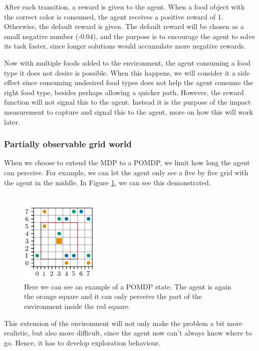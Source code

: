 \documentclass[12pt,A4]{report}
\theoremstyle{definition}
\begin{document}
After each transition, a reward is given to the agent. When a food object with the correct color is consumed, the agent receives a positive reward of 1. Otherwise, the default reward is given. The default reward will be chosen as a small negative number (-0.04), and the purpose is to encourage the agent to solve its task faster, since longer solutions would accumulate more negative rewards.

Now with multiple foods added to the environment, the agent consuming a food type it does not desire is possible. When this happens, we will consider it a side effect since consuming undesired food types does not help the agent consume the right food type, besides perhaps allowing a quicker path. However, the reward function will not signal this to the agent. Instead it is the purpose of the impact measurement to capture and signal this to the agent, more on how this will work later.

\subsubsection{Partially observable grid world}
When we choose to extend the MDP to a POMDP, we limit how long the agent can perceive. For example, we can let the agent only see a five by five grid with the agent in the middle. In Figure \ref{fig:redline}, we can see this demonstrated. 

\begin{figure}[H]
  \centering
  \includegraphics[width=4cm]{"./figures/redline.png"}
  \caption{Here we can see an example of a POMDP state. The agent is again the orange square and it can only perceive the part of the environment inside the red square.}
  \label{fig:redline}
\end{figure}

This extension of the environment will not only make the problem a bit more realistic, but also more difficult, since the agent now can't always know where to go. Hence, it has to develop exploration behaviour. 
\end{document}
